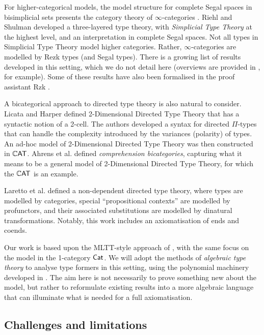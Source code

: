 For higher-categorical models,
the model structure for complete Segal spaces in bisimplicial sets
presents the category theory of $\infty$-categories \cite{riehlverity2017}.
Riehl and Shulman \cite{riehl2017} developed a three-layered type theory,
with \emph{Simplicial Type Theory} at the highest level,
and an interpretation in complete Segal spaces.
Not all types in Simplicial Type Theory model higher categories.
Rather, $\infty$-categories are modelled by Rezk types (and Segal types).
There is a growing list of results developed in this setting,
which we do not detail here
(overviews are provided in \cite{riehl2025, gratzer2026}, for example).
Some of these results have also been formalised in the proof assistant Rzk \cite{rzk}.

A bicategorical approach to directed type theory is also natural to consider.
Licata and Harper \cite{licata2011} defined 2-Dimensional Directed Type Theory
that has a syntactic notion of a 2-cell.
The authors developed a syntax for directed $\Pi$-types
that can handle the complexity introduced by the variances (polarity) of types.
An ad-hoc model of 2-Dimensional Directed Type Theory was
then constructed in $\mathbb{C}\mathsf{AT}$.
Ahrens et al. \cite{ahrens2023} defined \emph{comprehension bicategories},
capturing what it means to be a general model of 2-Dimensional Directed Type Theory,
for which the $\mathbb{C}\mathsf{AT}$ is an example.

Laretto et al. \cite{laretto2026} defined a non-dependent directed type theory,
where types are modelled by categories,
special ``propositional contexts'' are modelled by profunctors,
and their associated substitutions are modelled by dinatural transformations.
Notably, this work includes an axiomatisation of ends and coends.

Our work is based upon the MLTT-style approach of \cite{north2019, altenkirch2024},
with the same focus on the model in the 1-category $\mathsf{Cat}$.
We will adopt the methods of \emph{algebraic type theory} \cite{awodey2025}
to analyse type formers in this setting,
using the polynomial machinery developed in .
The aim here is not necessarily to prove something new about the model,
but rather to reformulate existing results into a more algebraic language
that can illuminate what is needed for a full axiomatisation.

\subsection*{Challenges and limitations}

